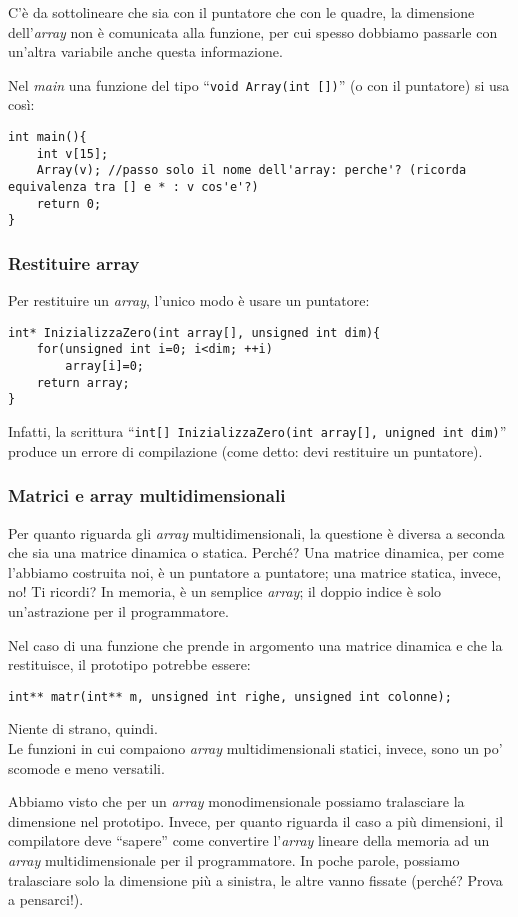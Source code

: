 C'è da sottolineare che sia con il puntatore che con le quadre, la dimensione dell'\emph{array} non è comunicata alla funzione, per cui spesso dobbiamo passarle con un'altra variabile  anche questa informazione.

Nel \emph{main} una funzione del tipo ``\lstinline|void Array(int [])|'' (o con il puntatore) si usa così:
\begin{lstlisting}
int main(){
	int v[15];
	Array(v); //passo solo il nome dell'array: perche'? (ricorda equivalenza tra [] e * : v cos'e'?)
	return 0;
}
\end{lstlisting}

\subsubsection{Restituire array} Per restituire un \emph{array}, l'unico modo è usare un puntatore:
\begin{lstlisting}
int* InizializzaZero(int array[], unsigned int dim){
	for(unsigned int i=0; i<dim; ++i)
		array[i]=0;
	return array;
}
\end{lstlisting}

Infatti, la scrittura ``\lstinline|int[] InizializzaZero(int array[], unigned int dim)|'' produce un errore di compilazione (come detto: devi restituire un puntatore).

\subsubsection{Matrici e array multidimensionali}
Per quanto riguarda gli \emph{array} multidimensionali, la questione è diversa a seconda che sia una matrice dinamica o statica. Perché? Una matrice dinamica, per come l'abbiamo costruita noi, è un puntatore a puntatore; una matrice statica, invece, no! Ti ricordi?  In memoria, è un semplice \emph{array}; il doppio indice è solo un'astrazione per il programmatore. 

Nel caso di una funzione che prende in argomento  una matrice dinamica e che la restituisce, il prototipo potrebbe essere:
\begin{lstlisting}
int** matr(int** m, unsigned int righe, unsigned int colonne);
\end{lstlisting}
Niente di strano, quindi.\\

Le funzioni in cui compaiono \emph{array} multidimensionali statici, invece, sono un po' scomode e meno versatili.

Abbiamo visto che per un \emph{array} monodimensionale possiamo tralasciare la dimensione nel prototipo. Invece, per quanto riguarda il caso a più dimensioni, il compilatore deve ``sapere'' come convertire l'\emph{array} lineare della memoria ad un \emph{array} multidimensionale per il programmatore. In poche parole, possiamo tralasciare solo la dimensione più a sinistra, le altre vanno fissate (perché? Prova a pensarci!). 

